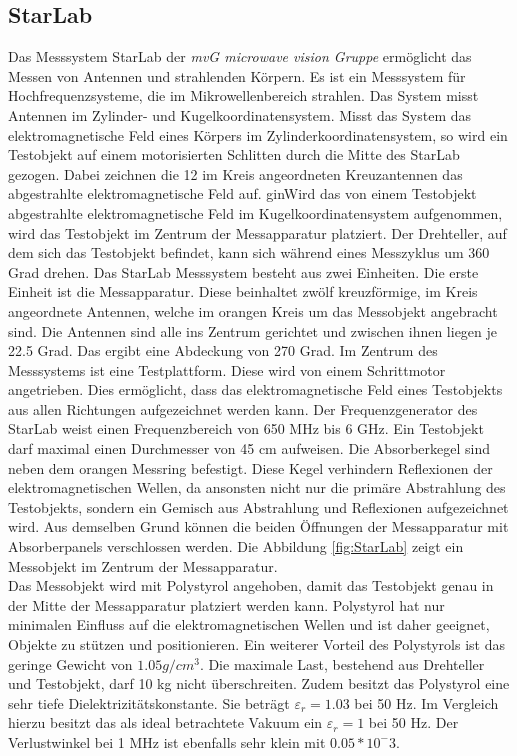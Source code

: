 \subsection{StarLab}
Das Messsystem  StarLab der \textit{mvG microwave vision Gruppe} ermöglicht das Messen von Antennen und strahlenden Körpern. Es ist ein Messsystem für Hochfrequenzsysteme, die im Mikrowellenbereich strahlen. Das System misst Antennen im Zylinder- und Kugelkoordinatensystem. Misst das System das elektromagnetische Feld eines Körpers im Zylinderkoordinatensystem, so wird ein Testobjekt auf einem motorisierten Schlitten durch die Mitte des StarLab gezogen. Dabei zeichnen die 12 im Kreis angeordneten Kreuzantennen das abgestrahlte elektromagnetische Feld auf. 
ginWird das von einem Testobjekt abgestrahlte elektromagnetische Feld im Kugelkoordinatensystem aufgenommen, wird das Testobjekt im Zentrum der Messapparatur platziert. Der Drehteller, auf dem sich das Testobjekt befindet, kann sich während eines Messzyklus um 360 Grad drehen. 
Das StarLab Messsystem besteht aus  zwei Einheiten. Die erste Einheit ist die Messapparatur. Diese beinhaltet zwölf kreuzförmige, im Kreis angeordnete Antennen, welche im orangen Kreis um das Messobjekt angebracht sind.  Die Antennen sind alle ins Zentrum gerichtet und zwischen ihnen liegen je 22.5 Grad. Das ergibt eine Abdeckung von 270 Grad. Im Zentrum des Messsystems ist eine Testplattform. Diese wird von einem Schrittmotor angetrieben. Dies ermöglicht, dass das elektromagnetische Feld eines Testobjekts aus allen Richtungen aufgezeichnet werden kann. Der Frequenzgenerator des StarLab weist einen Frequenzbereich von 650 MHz bis 6 GHz. Ein Testobjekt darf maximal einen Durchmesser von 45 cm aufweisen.
Die Absorberkegel sind neben dem orangen Messring befestigt. Diese Kegel verhindern Reflexionen der elektromagnetischen Wellen, da ansonsten nicht nur die primäre Abstrahlung des Testobjekts, sondern ein Gemisch aus Abstrahlung und Reflexionen aufgezeichnet wird. Aus demselben Grund können die beiden Öffnungen der Messapparatur mit Absorberpanels verschlossen werden. Die Abbildung \ref{fig:StarLab} zeigt ein Messobjekt im Zentrum der Messapparatur. \\
Das Messobjekt wird mit Polystyrol angehoben, damit das Testobjekt genau in der Mitte der Messapparatur platziert werden kann. Polystyrol hat nur minimalen Einfluss auf die elektromagnetischen Wellen und ist daher geeignet, Objekte zu stützen und positionieren. Ein weiterer Vorteil des Polystyrols ist das geringe Gewicht von $1.05 g/cm^3$. Die maximale Last, bestehend aus Drehteller und Testobjekt, darf  10 kg  nicht überschreiten. Zudem besitzt das Polystyrol eine sehr tiefe Dielektrizitätskonstante. Sie beträgt $\varepsilon_r=1.03$ bei 50 Hz. Im Vergleich hierzu besitzt das als ideal betrachtete Vakuum   ein $\varepsilon_r=1$ bei 50 Hz. Der Verlustwinkel bei 1 MHz ist ebenfalls sehr klein mit $0.05*10^-3$.
\cite{StarLab,Polystyrol_Datenblatt,WikiPermitt} 

